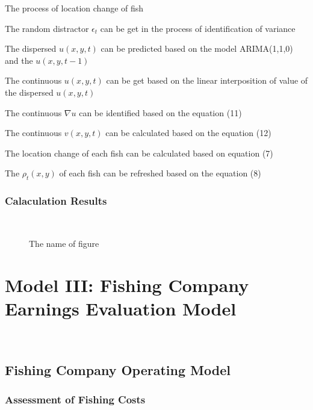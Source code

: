 \documentclass{mcmthesis}
\begin{document}
\begin{algorithm} 
	\caption{The process of location change of fish}
	\label{alg:plf}
	{  
		The random distractor $\epsilon _t$ can be get in the process of identification of variance
		
		The dispersed $u(x, y, t)$ can be predicted based on the model ARIMA(1,1,0) and the	$u(x, y, t-1)$
		
		The continuous $u(x, y, t)$ can be get based on the linear interposition of value of the dispersed $u(x, y, t)$
		
		The continuous $\nabla u$ can be identified based on the equation (11)
		
		The continuous $v(x, y, t)$ can be calculated based on the equation (12)
		
		The location change of each fish can be calculated based on equation (7)
		
		The $\rho_t(x, y)$ of each fish can be refreshed based on the equation (8)
	}
\end{algorithm}


\subsubsection{Calaculation Results}
\ 
\indent \lipsum[27]

\begin{figure}[htbp]
	\centering
	\hspace{1in}
	\caption{The name of figure} \label{fig:bb}
\end{figure}


\section{Model III: Fishing Company Earnings Evaluation Model}
\ 
\indent \lipsum[28]
\subsection{Fishing Company Operating Model}
\subsubsection{Assessment of Fishing Costs}
\ 
\indent \lipsum[29]
\end{document}
